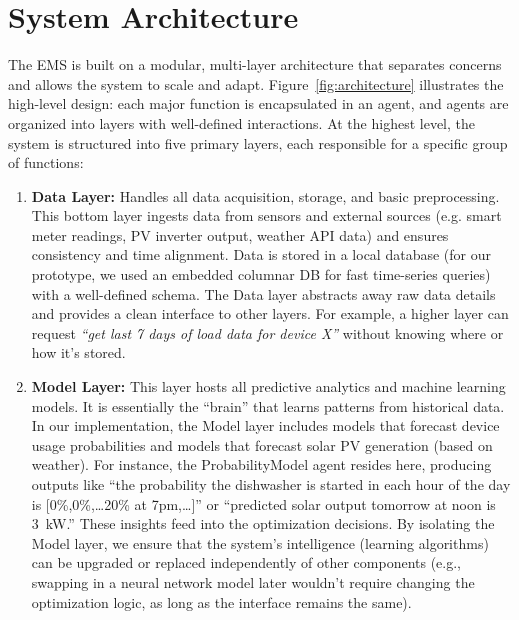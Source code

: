 \documentclass[12pt,a4paper]{article}
\begin{document}
\section{System Architecture}
The EMS is built on a modular, multi-layer architecture that separates concerns and allows the system to scale and adapt. Figure~\ref{fig:architecture} illustrates the high-level design: each major function is encapsulated in an agent, and agents are organized into layers with well-defined interactions. At the highest level, the system is structured into five primary layers, each responsible for a specific group of functions:
\begin{enumerate}
    \item \textbf{Data Layer:} Handles all data acquisition, storage, and basic preprocessing. This bottom layer ingests data from sensors and external sources (e.g. smart meter readings, PV inverter output, weather API data) and ensures consistency and time alignment. Data is stored in a local database (for our prototype, we used an embedded columnar DB for fast time-series queries) with a well-defined schema. The Data layer abstracts away raw data details and provides a clean interface to other layers. For example, a higher layer can request \emph{“get last 7 days of load data for device X”} without knowing where or how it’s stored.
    \item \textbf{Model Layer:} This layer hosts all predictive analytics and machine learning models. It is essentially the “brain” that learns patterns from historical data. In our implementation, the Model layer includes models that forecast device usage probabilities and models that forecast solar PV generation (based on weather). For instance, the ProbabilityModel agent resides here, producing outputs like “the probability the dishwasher is started in each hour of the day is [0\%,0\%,…20\% at 7pm,…]” or “predicted solar output tomorrow at noon is 3~kW.” These insights feed into the optimization decisions. By isolating the Model layer, we ensure that the system’s intelligence (learning algorithms) can be upgraded or replaced independently of other components (e.g., swapping in a neural network model later wouldn’t require changing the optimization logic, as long as the interface remains the same).

\end{enumerate}
\end{document}
